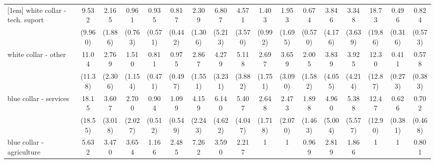 {\begin{tabular}{l*{16}{c}}
[1em]
white collar - tech. suport&       9.532\sym{*}  &       2.165         &       0.961         &       0.935         &       0.817         &       2.309         &       6.807\sym{*}  &       4.571         &       1.403         &       1.953         &       0.674         &       3.846         &       3.348         &       18.73\sym{**} &       0.496         &       0.824         \\
                    &     (9.960)         &     (1.886)         &     (0.763)         &     (0.571)         &     (0.442)         &     (1.306)         &     (5.213)         &     (3.570)         &     (0.992)         &     (1.695)         &     (0.570)         &     (4.176)         &     (3.639)         &     (19.86)         &     (0.316)         &     (0.573)         \\
[1em]
white collar - other&       11.04\sym{*}  &       2.769         &       1.510         &       0.811         &       0.975         &       2.867         &       4.279         &       5.118\sym{*}  &       2.697         &       3.659         &       2.005         &       3.839         &       3.925         &       12.30\sym{*}  &       0.411         &       0.578         \\
                    &     (11.38)         &     (2.306)         &     (1.154)         &     (0.471)         &     (0.497)         &     (1.551)         &     (3.231)         &     (3.882)         &     (1.751)         &     (3.090)         &     (1.582)         &     (4.055)         &     (4.214)         &     (12.87)         &     (0.273)         &     (0.383)         \\
[1em]
blue collar - services&       18.15\sym{**} &       3.607         &       2.700         &       0.904         &       1.099         &       4.159\sym{**} &       6.140\sym{*}  &       5.407\sym{*}  &       2.648         &       2.473         &       1.898         &       4.960         &       5.388         &       12.47\sym{*}  &       0.626         &       0.702         \\
                    &     (18.55)         &     (3.018)         &     (2.027)         &     (0.512)         &     (0.549)         &     (2.243)         &     (4.622)         &     (4.047)         &     (1.718)         &     (2.070)         &     (1.463)         &     (5.004)         &     (5.577)         &     (12.90)         &     (0.381)         &     (0.468)         \\
[1em]
blue collar - agriculture&       5.632         &       3.470         &       3.654         &       1.166         &       2.485         &       7.262\sym{*}  &       3.590         &       2.217         &           1         &           1         &       0.969         &       2.819         &       1.866         &           1         &           1         &       0.801         \\

\end{tabular}}
